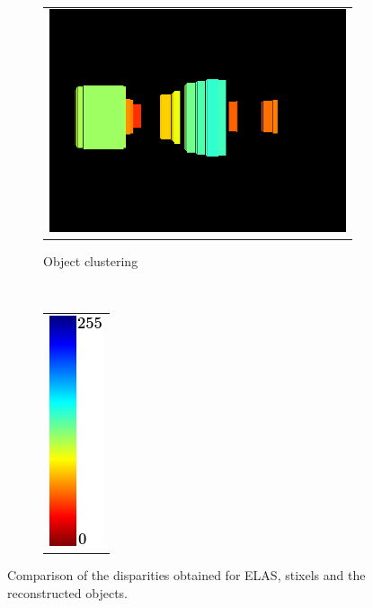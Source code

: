 \begin{figure}[h!]
\begin{subfigure}[b]{0.29\textwidth}
        \end{subfigure}%
        ~~~
        \begin{subfigure}[b]{0.29\textwidth}
	  \begin{tabular}{c}
	    \includegraphics[height=0.375\figuresheight]{objects}
	  \end{tabular}
	  \caption{Object clustering}\label{fig:cp04_reconstruction_objects}
        \end{subfigure}%
        ~~~
        \begin{subfigure}[b]{0.29\textwidth}
	  \begin{tabular}{c}
	    \includegraphics[height=0.375\figuresheight]{colorscale_jet}
	  \end{tabular}
	  \caption*{}\label{fig:cp04_reconstruction_colorscale}
        \end{subfigure}%
        \caption{Comparison of the disparities obtained for \ac{ELAS}, stixels and the reconstructed objects.}\label{fig:cp04_reconstruction}
\end{figure}

